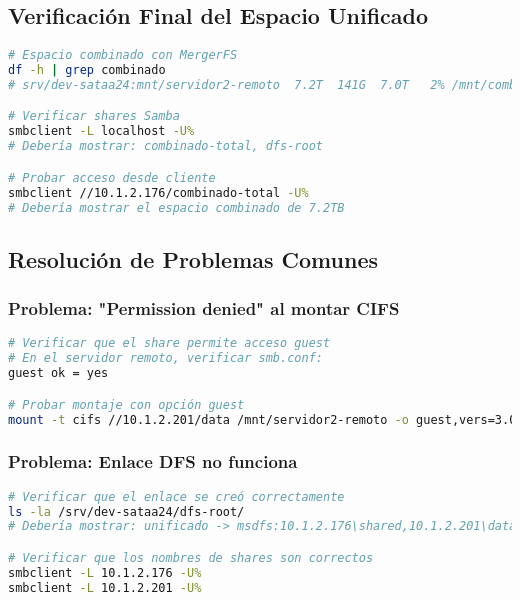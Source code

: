 \documentclass[12pt, a4paper]{article}
\begin{document}
\subsection{Verificación Final del Espacio Unificado}
\label{subsec:verificacion_espacio_unificado}

\begin{lstlisting}[language=bash, caption=Verificación final del éxito]
# Espacio combinado con MergerFS
df -h | grep combinado
# srv/dev-sataa24:mnt/servidor2-remoto  7.2T  141G  7.0T   2% /mnt/combinado

# Verificar shares Samba
smbclient -L localhost -U%
# Debería mostrar: combinado-total, dfs-root

# Probar acceso desde cliente
smbclient //10.1.2.176/combinado-total -U%
# Debería mostrar el espacio combinado de 7.2TB
\end{lstlisting}

\subsection{Resolución de Problemas Comunes}
\label{subsec:resolucion_problemas_unificacion}

\subsubsection{Problema: "Permission denied" al montar CIFS}
\begin{lstlisting}[language=bash, caption=Solución para problemas de permisos]
# Verificar que el share permite acceso guest
# En el servidor remoto, verificar smb.conf:
guest ok = yes

# Probar montaje con opción guest
mount -t cifs //10.1.2.201/data /mnt/servidor2-remoto -o guest,vers=3.0
\end{lstlisting}

\subsubsection{Problema: Enlace DFS no funciona}
\begin{lstlisting}[language=bash, caption=Verificación de enlaces DFS]
# Verificar que el enlace se creó correctamente
ls -la /srv/dev-sataa24/dfs-root/
# Debería mostrar: unificado -> msdfs:10.1.2.176\shared,10.1.2.201\data

# Verificar que los nombres de shares son correctos
smbclient -L 10.1.2.176 -U%
smbclient -L 10.1.2.201 -U%
\end{lstlisting}
\end{document}
